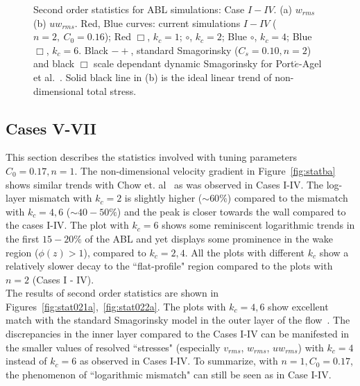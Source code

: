 \begin{figure}
\begin{subfigure}[t]{0.75\textwidth}
                \caption{}
                \label{fig:uwrms}
        \end{subfigure}
        \caption[Second order statistics $w_{rms}, \ uw_{rms}$, Case $I-IV$]{Second order statistics for ABL simulations: Case $I-IV$. (a) $w_{rms}$ (b) $uw_{rms}$. Red, Blue curves: current simulations $I-IV$ ($n = 2, \ C_0 = 0.16$);  Red $\Box$, $k_{c}=1$; $\circ$, $k_{c}=2$; Blue $\circ$, $k_{c} = 4$; Blue $\Box$, $k_{c} = 6$.  Black $-+$, standard Smagorinsky ($C_s = 0.10, n = 2$) and black $\Box$ scale dependant dynamic Smagorinsky for Port$\acute{e}$-Agel et al.~\cite{porte1fun}. Solid black line in (b) is the ideal linear trend of non-dimensional total stress.}\label{fig:stat22}
\end{figure}
\subsection{Cases V-VII}
This section describes the statistics involved with tuning parameters $C_0 = 0.17, n = 1$.  The non-dimensional velocity gradient in Figure~\ref{fig:statba} shows similar trends with Chow et. al~\cite{chow} as was observed in Cases I-IV. The log-layer mismatch with $k_c = 2$ is slightly higher ($\sim 60\%$) compared to the mismatch with $k_c = 4, 6$ ($\sim 40-50\%$) and the peak is closer towards the wall compared to the cases I-IV. The plot with $k_c = 6$ shows some reminiscent logarithmic trends {in the first $15-20\%$} of the ABL and yet displays some prominence in the wake region ($\phi(z) > 1$), compared to $k_c = 2, 4$. All the plots with different $k_c$ show a relatively slower decay to the ``flat-profile" region compared to the plots with $n=2$ (Cases I - IV).\\
The results of second order statistics are shown in Figure{s}~\ref{fig:stat021a},~\ref{fig:stat022a}. The plots with $k_c = 4, 6$ show excellent match with the standard Smagorinsky model in the outer layer of the flow~\cite{porte1fun}. The discrepancies in the inner layer compared to the Cases I-IV can be manifested in the 
{smaller values}  of resolved ``stresses" (especially $v_{rms}$, $w_{rms}$, $uw_{rms}$) with $k_c = 4$ instead of $k_c = 6$ as observed in Cases I-IV. To summarize, 
with $n = 1, C_0 = 0.17$, the phenomenon of ``logarithmic mismatch" can {still} be seen as in Case I-IV. 
